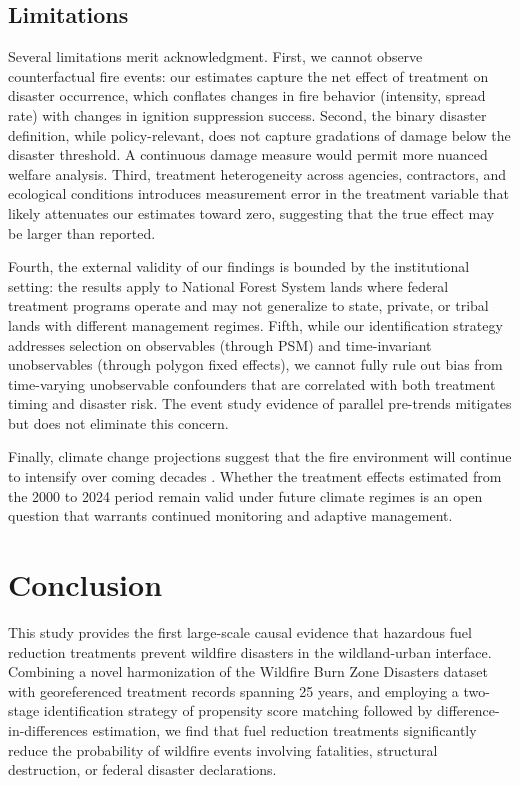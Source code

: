 \documentclass[12pt, letterpaper]{article}
\begin{document}
\subsection{Limitations}

Several limitations merit acknowledgment. First, we cannot observe counterfactual fire events: our estimates capture the net effect of treatment on disaster occurrence, which conflates changes in fire behavior (intensity, spread rate) with changes in ignition suppression success. Second, the binary disaster definition, while policy-relevant, does not capture gradations of damage below the disaster threshold. A continuous damage measure would permit more nuanced welfare analysis. Third, treatment heterogeneity across agencies, contractors, and ecological conditions introduces measurement error in the treatment variable that likely attenuates our estimates toward zero, suggesting that the true effect may be larger than reported.

Fourth, the external validity of our findings is bounded by the institutional setting: the results apply to National Forest System lands where federal treatment programs operate and may not generalize to state, private, or tribal lands with different management regimes. Fifth, while our identification strategy addresses selection on observables (through PSM) and time-invariant unobservables (through polygon fixed effects), we cannot fully rule out bias from time-varying unobservable confounders that are correlated with both treatment timing and disaster risk. The event study evidence of parallel pre-trends mitigates but does not eliminate this concern.

Finally, climate change projections suggest that the fire environment will continue to intensify over coming decades \citep{brown2023}. Whether the treatment effects estimated from the 2000 to 2024 period remain valid under future climate regimes is an open question that warrants continued monitoring and adaptive management.


\section{Conclusion}

This study provides the first large-scale causal evidence that hazardous fuel reduction treatments prevent wildfire disasters in the wildland-urban interface. Combining a novel harmonization of the Wildfire Burn Zone Disasters dataset with georeferenced treatment records spanning 25 years, and employing a two-stage identification strategy of propensity score matching followed by difference-in-differences estimation, we find that fuel reduction treatments significantly reduce the probability of wildfire events involving fatalities, structural destruction, or federal disaster declarations.
\end{document}
